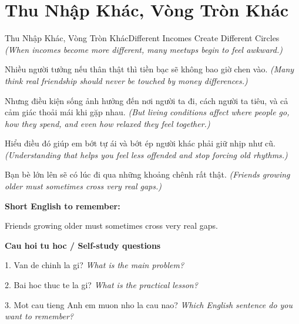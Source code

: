 \section{Thu Nhập Khác, Vòng Tròn Khác}
\begin{truyen}{Thu Nhập Khác, Vòng Tròn Khác}{Different Incomes Create Different Circles}
\textit{(When incomes become more different, many meetups begin to feel awkward.)}

Nhiều người tưởng nếu thân thật thì tiền bạc sẽ không bao giờ chen vào.
\textit{(Many think real friendship should never be touched by money differences.)}

Nhưng điều kiện sống ảnh hưởng đến nơi người ta đi, cách người ta tiêu, và cả cảm giác thoải mái khi gặp nhau.
\textit{(But living conditions affect where people go, how they spend, and even how relaxed they feel together.)}

Hiểu điều đó giúp em bớt tự ái và bớt ép người khác phải giữ nhịp như cũ.
\textit{(Understanding that helps you feel less offended and stop forcing old rhythms.)}

\end{truyen}

\begin{baihoc}
Bạn bè lớn lên sẽ có lúc đi qua những khoảng chênh rất thật.
\textit{(Friends growing older must sometimes cross very real gaps.)}
\end{baihoc}

\begin{ghinhoanh}
\textbf{Short English to remember:}

Friends growing older must sometimes cross very real gaps.

\end{ghinhoanh}

\begin{tuhocnhanh}
\textbf{Cau hoi tu hoc / Self-study questions}

1. Van de chinh la gi? \textit{What is the main problem?}

2. Bai hoc thuc te la gi? \textit{What is the practical lesson?}

3. Mot cau tieng Anh em muon nho la cau nao? \textit{Which English sentence do you want to remember?}
\end{tuhocnhanh}
\ngancach

